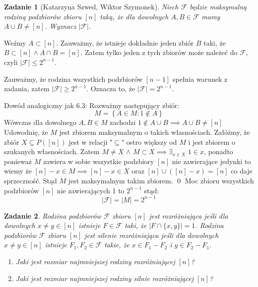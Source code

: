 \documentclass{mwart}
\newtheorem{zad}{Zadanie}[section]
\begin{document}
\begin{zad}[Katarzyna Szwed, Wiktor Szymonek]
    Niech $\mathcal{F}$ będzie maksymalną rodziną podzbiorów zbioru $[n]$ taką,
    że dla dowolnych $A, B \in \mathcal{F}$ mamy $A \cup B \neq [n]$. Wyznacz $|\mathcal{F}|$.
\end{zad}
\begin{mdframed}
    Weźmy $A \subset [n]$. Zauważmy, że istnieje dokładnie jeden zbiór $B$ taki, że $B \subset [n] \wedge A \cap B = [n]$. 
    Zatem tylko jeden z tych zbiorów może należeć do $\mathcal{F}$, czyli $|\mathcal{F}| \leq 2^{n-1}$.

    Zauważmy, że rodzina wszystkich podzbiorów $[n-1]$ spełnia warunek z zadania, zatem $|\mathcal{F}| \geq 2^{n-1}$. 
    Oznacza to, że $|\mathcal{F}| = 2^{n-1}$.
\end{mdframed}
\begin{mdframed}
    Dowód analogiczny jak 6.3: \bigskip
    \newline Rozważmy następujący zbiór:
    \[M = \left\{A\in M : 1 \notin A\right\}\]
    Wówczas dla dowolnego $A,B \in M$ zachodzi $1 \notin A \cup B \implies A\cup B \ne [n]$
    \newline Udowodnię, że $M$ jest zbiorem maksymalnym o takich własnościach. Załóżmy, że zbiór $X \subseteq P([n])$ 
    jest w relacji "$\subseteq$" ostro większy od $M$ i jest zbiorem o szukanych własnościach.
    \newline Zatem $M \neq X$ $\land$ $M \subset X \implies \exists_{x \in X}$  $ 1 \in x$, ponadto ponieważ
    $M$ zawiera w sobie wszystkie podzbiory $[n]$ nie zawierające jedynki to wiemy że $[n]-x \in M \implies [n]-x \in X$ 
    oraz $[n]\cup([n]-x) = [n]$ co daje sprzeczność. Stąd $M$ jest maksymalnym takim zbiorem.
    \qed
    \newline Moc zbioru wszystkich podzbiorów $[n]$ nie zawierających 1 to $2^{n-1}$ stąd:
    \[|\mathcal{F}| = |M| = 2^{n-1}\]
\end{mdframed}


\begin{zad}
    Rodzina podzbiorów $\mathcal{F}$ zbioru $[n]$ jest rozróżniająca jeśli dla dowolnych
    $x \neq y \in [n]$ istnieje $F \in \mathcal{F }$ taki, że $|F \cap \{x,y\}| = 1$.
    Rodzina podzbiorów $\mathcal{F }$ zbioru $[n]$ jest silenie rozróżniająca jeśli dla
    dowolnych $ x \neq y \in [n]$ istnieje $F_1,F_2 \in \mathcal{F }$ takie, że $x \in F_1-F_2$ i $y \in F_2 - F_1$.
    \begin{enumerate}
        \item Jaki jest rozmiar najmniejszej rodziny rozróżniającej $[n]$?
        \item Jaki jest rozmiar najmniejszej rodziny silnie rozróżniającej $[n]$?
    \end{enumerate}
\end{zad}
\begin{mdframed}

\end{mdframed}
\begin{mdframed}

\end{mdframed}
\end{document}
